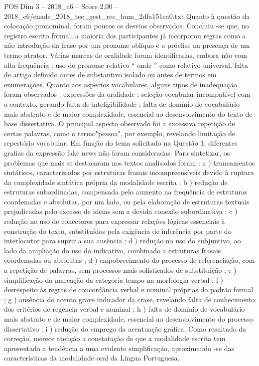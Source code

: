 \begin{textsample}{POS Dim 3 – 2018\_c6 – Score 2.00 – 2018\_c6/enade\_2018\_tec\_gest\_rec\_hum\_2dfa151ea0.txt}
Quanto à questão da colocação pronominal, foram poucos os desvios observados.
Concluiu -se que, no registro escrito formal, a maioria dos participantes já incorporou regras como a não introdução da frase por um pronome oblíquo e a próclise na presença de um termo atrator.
Várias marcas de oralidade foram identificadas, embora não com alta frequência : uso do pronome relativo “ onde ” como relativo universal, falta de artigo definido antes de substantivo isolado ou antes de termos em enumerações.
Quanto aos aspectos vocabulares, alguns tipos de inadequação foram observados : expressões da oralidade ; seleção vocabular incompatível com o contexto, gerando falta de inteligibilidade ; falta de domínio de vocabulário mais abstrato e de maior complexidade, essencial ao desenvolvimento do texto de base dissertativa.
O principal aspecto observado foi a excessiva repetição de certas palavras, como o termo"pessoa", por exemplo, revelando limitação de repertório vocabular.
Em função do tema solicitado na Questão 1, diferentes grafias da expressão fake news não foram consideradas.
Para sintetizar, os problemas que mais se destacaram nos textos analisados foram : a ) truncamentos sintáticos, caracterizados por estruturas frasais incompreensíveis devido à ruptura da complexidade sintática própria da modalidade escrita ; b ) redução de estruturas subordinadas, compensada pelo aumento na frequência de estruturas coordenadas e absolutas, por um lado, ou pela elaboração de estruturas textuais prejudicadas pelo excesso de ideias sem a devida conexão subordinativa ; c ) redução no uso de conectores para expressar relações lógicas essenciais à construção do texto, substituídos pela exigência de inferência por parte do interlocutor para suprir a sua ausência ; d ) redução no uso do subjuntivo, ao lado da ampliação do uso do indicativo, combinado a estruturas frasais coordenadas ou absolutas ; d ) empobrecimento do processo de referenciação, com a repetição de palavras, sem processos mais sofisticados de substituição ; e ) simplificação da marcação da categoria tempo na morfologia verbal ; f ) desrespeito às regras de concordância verbal e nominal próprias do padrão formal ; g ) ausência do acento grave indicador da crase, revelando falta de conhecimento dos critérios de regência verbal e nominal ; h ) falta de domínio de vocabulário mais abstrato e de maior complexidade, essencial ao desenvolvimento do processo dissertativo ; i ) redução do emprego da acentuação gráfica.
Como resultado da correção, merece atenção a constatação de que a modalidade escrita tem apresentado a tendência a uma evidente simplificação, aproximando -se das características da modalidade oral da Língua Portuguesa.

\end{textsample}

